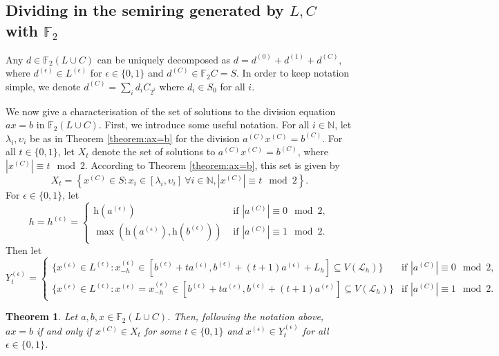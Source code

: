 \documentclass[a4paper, 11pt]{article}
\theoremstyle{plain}
\newtheorem{theorem}{Theorem}[section]
\theoremstyle{definition}
\newcommand{\N} {\mathbb{N}}
\newcommand{\F} {\mathbb{F}}
\newcommand{\Height}    {\mathrm{h}}
\begin{document}
\subsection{Dividing in the semiring generated by $L, C$ with $\F_2$} \label{subsection:division_LC}

Any $d \in \F_2(L \cup C)$ can be uniquely decomposed as $d = d^{(0)} + d^{(1)} + d^{(C)}$, where $d^{(\epsilon)} \in L^{(\epsilon)}$ for $\epsilon \in \{0,1\}$ and $d^{(C)} \in \F_2 C = S$. In order to keep notation simple, we denote $d^{(C)} = \sum_i d_i C_{2^i}$ where $d_i \in S_0$ for all $i$.



We now give a characterisation of the set of solutions to the division equation $ax = b$ in $\F_2( L \cup C )$. First, we introduce some useful notation. For all $i \in \N$, let $\lambda_i, \upsilon_i$ be as in Theorem \ref{theorem:ax=b} for the division $a^{(C)} x^{(C)} = b^{(C)}$. For all $t \in \{0,1\}$, let $X_t$ denote the set of solutions to $a^{(C)} x^{(C)} = b^{(C)}$, where $|x^{(C)}| \equiv t \mod 2$. According to Theorem \ref{theorem:ax=b}, this set is given by
\[
    X_t = \left\{ x^{(C)} \in S : x_i \in [ \lambda_i, \upsilon_i ] \ \forall i \in \N, |x^{(C)}| \equiv t \mod 2 \right\}.
\]
For $\epsilon \in \{0,1\}$, let
\[
    h = h^{(\epsilon)} = \begin{cases}
        \Height( a^{(\epsilon)} ) &\text{ if } |a^{(C)}| \equiv 0 \mod 2, \\
        \max ( \Height( a^{(\epsilon)} ), \Height( b^{(\epsilon)} ) ) &\text{ if } |a^{(C)}| \equiv 1 \mod 2.
    \end{cases}
\]
Then let
\[
    Y_t^{(\epsilon)} = \begin{cases} 
    \{ x^{(\epsilon)} \in L^{(\epsilon)} :  x^{(\epsilon)}_{ -h } \in [ b^{(\epsilon)} + t a^{(\epsilon)}, b^{(\epsilon)} + (t + 1) a^{(\epsilon)} + L_h ] \subseteq V( \mathcal{L}_h ) \} & \text{if } |a^{(C)}| \equiv 0 \mod 2,\\
    \{ x^{(\epsilon)} \in L^{(\epsilon)} : x^{(\epsilon)} = x^{(\epsilon)}_{ -h } \in [ b^{(\epsilon)} + t a^{(\epsilon)}, b^{(\epsilon)} + (t + 1) a^{(\epsilon)} ] \subseteq V( \mathcal{L}_h ) \} & \text{if } |a^{(C)}| \equiv 1 \mod 2.
    \end{cases}
\]


\begin{theorem} \label{theorem:division_LC}
Let $a, b, x \in \F_2(L \cup C)$. Then, following the notation above, $ax = b$ if and only if $x^{(C)} \in X_t$ for some $t \in \{0,1\}$ and $x^{(\epsilon)} \in  Y_t^{(\epsilon)}$ for all $\epsilon \in \{0,1\}$.
\end{theorem}
\end{document}
